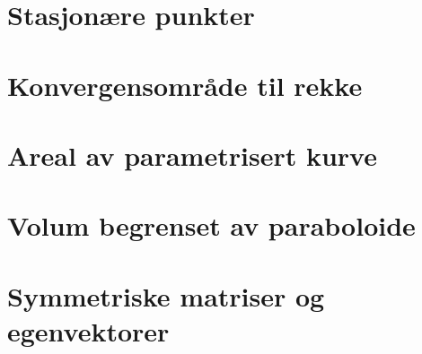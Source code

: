 \documentclass{article}
\begin{document}
  \section*{Stasjonære punkter}
    
  \section*{Konvergensområde til rekke}
    
  \section*{Areal av parametrisert kurve}
    
  \section*{Volum begrenset av paraboloide}
    
  \section*{Symmetriske matriser og egenvektorer}
    
\end{document}
